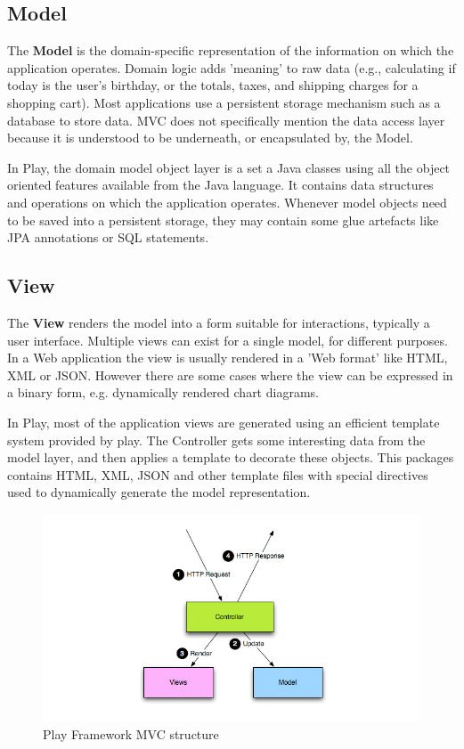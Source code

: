 \subsection{Model}
The \textbf{Model} is the domain-specific representation of the information on which the application operates.
Domain logic adds 'meaning' to raw data (e.g., calculating if today is the user's birthday, or the totals, taxes, and shipping charges for a shopping cart).
 Most applications use a persistent storage mechanism such as a database to store data.
MVC does not specifically mention the data access layer because it is understood to be underneath, or encapsulated by, the Model.

In Play, the domain model object layer is a set a Java classes using all the object oriented features available from the Java language. 
It contains data structures and operations on which the application operates. 
Whenever model objects need to be saved into a persistent storage, they may contain some glue artefacts like JPA annotations or SQL statements.

\subsection{View}
The \textbf{View} renders the model into a form suitable for interactions, typically a user interface.
Multiple views can exist for a single model, for different purposes.
In a Web application the view is usually rendered in a 'Web format' like HTML, XML or JSON.
However there are some cases where the view can be expressed in a binary form, e.g. dynamically rendered chart diagrams.

In Play, most of the application views are generated using an efficient template system provided by play. 
The Controller gets some interesting data from the model layer, and then applies a template to decorate these objects. 
This packages contains HTML, XML, JSON and other template files with special directives used to dynamically generate the model representation.
\\
\begin{figure}[h]
  \centering
    \captionsetup{justification=centering}
    \includegraphics[width=\textwidth]{play_mvc}
    \caption{Play Framework MVC structure}
  \label{play_mvc_image}
\end{figure}


